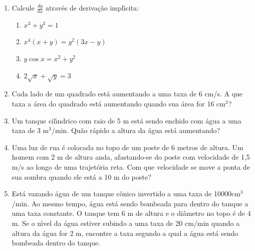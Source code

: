 \documentclass[a4paper,5pt]{amsbook}
\newcommand{\ds}{\displaystyle}
\begin{document}
\vspace{1cm}
\begin{enumerate}
    \vspace{0.5cm}
    \item Calcule $\ds\frac{dy}{dx}$ atrav\'es de deriva\c{c}\~ao impl\'{\i}cita:
        \begin{enumerate}
            \vspace{0.3cm}
            \item $x^3+y^3=1$
            \vspace{0.3cm}
            \item $x^4(x+y)=y^2(3x-y)$
            \vspace{0.3cm}
            \item $y\cos{x}=x^2+y^2$
            \vspace{0.3cm}
            \item $2\sqrt{x} + \sqrt{y}=3$
        \end{enumerate}

    \vspace{0.5cm}
    \item Cada lado de um quadrado est\'a aumentando a uma taxa de 6 cm/s. A
        que taxa a \'area do quadrado est\'a aumentando quando sua \'area for 16
        cm$^2$?

    \vspace{0.5cm}
    \item Um tanque cil\'{\i}ndrico com raio de 5 m est\'a sendo enchido com \'agua a
        uma taxa de 3 m$^3$/min. Qu\~ao r\'apido a altura da \'agua est\'a
        aumentando?

    \vspace{0.5cm}
    \item Uma luz de rua \'e colocada no topo de um poste de 6 metros de
        altura. Um homem com 2 m de altura anda, afastando-se do poste com
        velocidade de 1,5 m/s ao longo de uma trajet\'oria reta. Com que
        velocidade se move a ponta de sua sombra quando ele est\'a a 10 m do
        poste?

    \vspace{0.5cm}
    \item Est\'a vazando \'agua de um tanque c\^onico invertido a uma taxa de
        10000cm$^3$/min. Ao mesmo tempo, \'agua est\'a sendo bombeada para dentro do
        tanque a uma taxa constante. O tanque tem 6 m de altura e o di\^ametro
        no topo \'e de 4 m. Se o n\'{\i}vel da \'agua estiver subindo a uma taxa de 20
        cm/min quando a altura da \'agua for 2 m, encontre a taxa segundo a
        qual a \'agua est\'a sendo bombeada dentro do tanque.


\end{enumerate}
\end{document}
